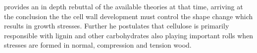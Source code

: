\cite{ISI:A1950XU10300003} provides an in depth rebuttal of the available theories at that
time, arriving at the conclusion the the cell wall development must control the shape
change which results in growth stresses. Further he postulates that cellulose
is primarily responsible with lignin and other carbohydrates also playing important
rolls when stresses are formed in normal, compression and tension wood. 